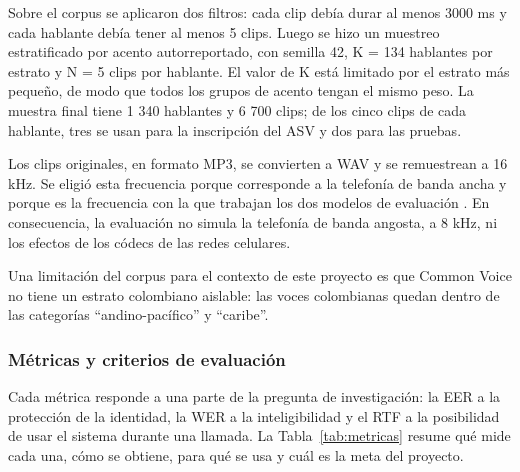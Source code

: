 \documentclass[10pt,twocolumn]{article}
\newcommand{\parencite}[1]{\citep{#1}}
\begin{document}
Sobre el corpus se aplicaron dos filtros: cada clip debía durar al menos 3000 ms y cada hablante debía tener al menos 5 clips. Luego se hizo un muestreo estratificado por acento autorreportado, con semilla 42, K = 134 hablantes por estrato y N = 5 clips por hablante. El valor de K está limitado por el estrato más pequeño, de modo que todos los grupos de acento tengan el mismo peso. La muestra final tiene 1 340 hablantes y 6 700 clips; de los cinco clips de cada hablante, tres se usan para la inscripción del ASV y dos para las pruebas.

Los clips originales, en formato MP3, se convierten a WAV y se remuestrean a 16 kHz. Se eligió esta frecuencia porque corresponde a la telefonía de banda ancha y porque es la frecuencia con la que trabajan los dos modelos de evaluación \parencite{openaiwhisper2025,speechbrainModel}. En consecuencia, la evaluación no simula la telefonía de banda angosta, a 8 kHz, ni los efectos de los códecs de las redes celulares.

Una limitación del corpus para el contexto de este proyecto es que Common Voice no tiene un estrato colombiano aislable: las voces colombianas quedan dentro de las categorías ``andino-pacífico'' y ``caribe''.

\subsubsection{Métricas y criterios de evaluación}\label{sec:3.6.2}

Cada métrica responde a una parte de la pregunta de investigación: la EER a la protección de la identidad, la WER a la inteligibilidad y el RTF a la posibilidad de usar el sistema durante una llamada. La Tabla~\ref{tab:metricas} resume qué mide cada una, cómo se obtiene, para qué se usa y cuál es la meta del proyecto.
\end{document}
